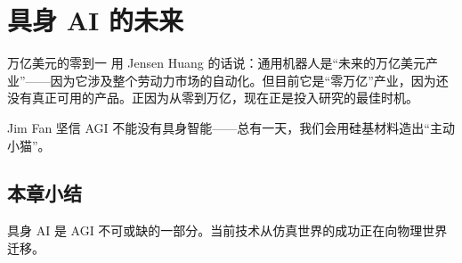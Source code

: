 \section{具身 AI 的未来}

\begin{importantbox}{万亿美元的零到一}
用 Jensen Huang 的话说：通用机器人是``未来的万亿美元产业''——因为它涉及整个劳动力市场的自动化。但目前它是``零万亿''产业，因为还没有真正可用的产品。正因为从零到万亿，现在正是投入研究的最佳时机。
\end{importantbox}

Jim Fan 坚信 AGI 不能没有具身智能——总有一天，我们会用硅基材料造出``主动小猫''。

\subsection{本章小结}

具身 AI 是 AGI 不可或缺的一部分。当前技术从仿真世界的成功正在向物理世界迁移。

